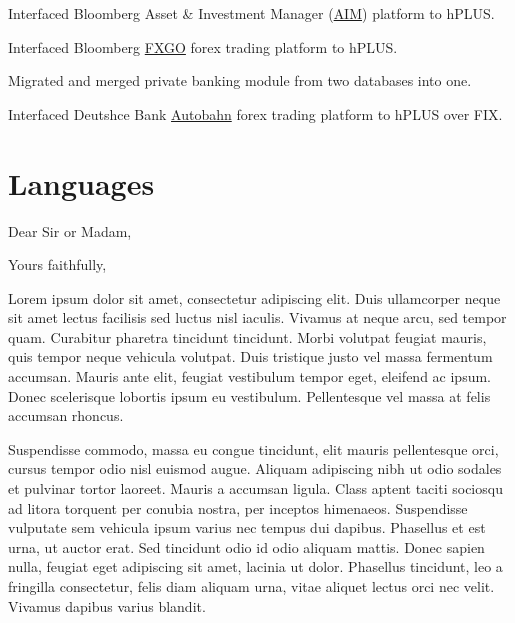\documentclass[11pt,a4paper,sans]{moderncv}        %
\begin{document}
\item Interfaced Bloomberg Asset \& Investment Manager (\href{http://www.bloomberg.com/trading-solutions/buy-side/}{AIM}) platform to hPLUS.
\item Interfaced Bloomberg \href{http://www.bloomberg.com/professional/foreign-exchange/}{FXGO} forex trading platform to hPLUS.
\item Migrated and merged private banking module from two databases into one.
\item Interfaced Deutshce Bank \href{https://autobahn.db.com/microSite/html/fx.html}{Autobahn} forex trading platform to hPLUS over FIX.

\section{Languages}

\date{January 01, 1984}
\opening{Dear Sir or Madam,}
\closing{Yours faithfully,}
\makelettertitle

Lorem ipsum dolor sit amet, consectetur adipiscing elit. Duis ullamcorper neque sit amet lectus facilisis sed luctus nisl iaculis. Vivamus at neque arcu, sed tempor quam. Curabitur pharetra tincidunt tincidunt. Morbi volutpat feugiat mauris, quis tempor neque vehicula volutpat. Duis tristique justo vel massa fermentum accumsan. Mauris ante elit, feugiat vestibulum tempor eget, eleifend ac ipsum. Donec scelerisque lobortis ipsum eu vestibulum. Pellentesque vel massa at felis accumsan rhoncus.

Suspendisse commodo, massa eu congue tincidunt, elit mauris pellentesque orci, cursus tempor odio nisl euismod augue. Aliquam adipiscing nibh ut odio sodales et pulvinar tortor laoreet. Mauris a accumsan ligula. Class aptent taciti sociosqu ad litora torquent per conubia nostra, per inceptos himenaeos. Suspendisse vulputate sem vehicula ipsum varius nec tempus dui dapibus. Phasellus et est urna, ut auctor erat. Sed tincidunt odio id odio aliquam mattis. Donec sapien nulla, feugiat eget adipiscing sit amet, lacinia ut dolor. Phasellus tincidunt, leo a fringilla consectetur, felis diam aliquam urna, vitae aliquet lectus orci nec velit. Vivamus dapibus varius blandit.
\end{document}
